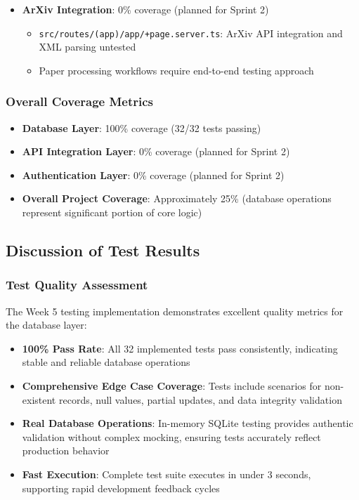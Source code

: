 \documentclass[12pt]{article}
\begin{document}
\begin{itemize}
  \item \textbf{ArXiv Integration}: 0\% coverage (planned for Sprint 2)
    \begin{itemize}
      \item \texttt{src/routes/(app)/app/+page.server.ts}: ArXiv API integration and XML parsing untested
      \item Paper processing workflows require end-to-end testing approach
    \end{itemize}
\end{itemize}

\subsubsection{Overall Coverage Metrics}
\begin{itemize}
  \item \textbf{Database Layer}: 100\% coverage (32/32 tests passing)
  \item \textbf{API Integration Layer}: 0\% coverage (planned for Sprint 2)
  \item \textbf{Authentication Layer}: 0\% coverage (planned for Sprint 2)
  \item \textbf{Overall Project Coverage}: Approximately 25\% (database operations represent significant portion of core logic)
\end{itemize}

\subsection{Discussion of Test Results}

\subsubsection{Test Quality Assessment}
The Week 5 testing implementation demonstrates excellent quality metrics for the database layer:

\begin{itemize}
  \item \textbf{100\% Pass Rate}: All 32 implemented tests pass consistently, indicating stable and reliable database operations
  \item \textbf{Comprehensive Edge Case Coverage}: Tests include scenarios for non-existent records, null values, partial updates, and data integrity validation
  \item \textbf{Real Database Operations}: In-memory SQLite testing provides authentic validation without complex mocking, ensuring tests accurately reflect production behavior
  \item \textbf{Fast Execution}: Complete test suite executes in under 3 seconds, supporting rapid development feedback cycles
\end{itemize}
\end{document}
